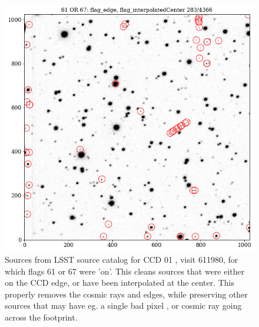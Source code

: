 \documentclass[DM,lsstdraft,toc,usenatbib]{lsstdoc}
\begin{document}
\begin{figure}
\includegraphics[width=1.0\columnwidth]{figs/06_LSST_mask_611980ccd01_61_67.png}
\caption{Sources from LSST source catalog for CCD 01 , visit 611980,  for which flags 61 or 67 were 'on'. This cleans sources that were either on the CCD edge, or have been interpolated at the center. This properly removes the cosmic rays and edges, while preserving other sources that may have eg. a single bad pixel , or cosmic ray going across the footprint. }
\label{fig:lsst_src_flags}
\end{figure} 
\end{document}
